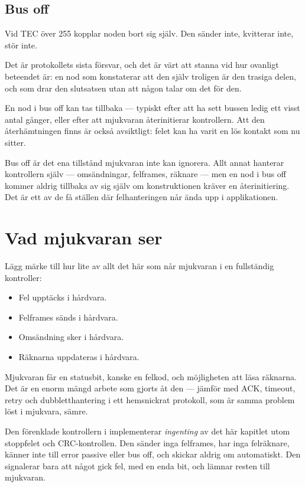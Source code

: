 \subsection{Bus off}

Vid TEC över 255 kopplar noden bort sig själv. Den sänder inte, kvitterar inte, stör inte.

Det är protokollets sista försvar, och det är värt att stanna vid hur ovanligt beteendet är: en
nod som konstaterar att den själv troligen är den trasiga delen, och som drar den slutsatsen
utan att någon talar om det för den.

En nod i bus off kan tas tillbaka --- typiskt efter att ha sett bussen ledig ett visst antal gånger,
eller efter att mjukvaran återinitierar kontrollern. Att den återhämtningen finns är också
avsiktligt: felet kan ha varit en lös kontakt som nu sitter.

\begin{aside}
 Bus off är det ena tillstånd mjukvaran inte kan ignorera.
Allt annat hanterar kontrollern själv --- omsändningar, felframes, räknare --- men en nod i bus off
kommer aldrig tillbaka av sig själv om konstruktionen kräver en återinitiering. Det är ett av de
få ställen där felhanteringen når ända upp i applikationen.
\end{aside}

\section{Vad mjukvaran ser}

Lägg märke till hur lite av allt det här som når mjukvaran i en fullständig kontroller:

\begin{itemize}
  \item Fel upptäcks i hårdvara.
  \item Felframes sänds i hårdvara.
  \item Omsändning sker i hårdvara.
  \item Räknarna uppdateras i hårdvara.
\end{itemize}

Mjukvaran får en statusbit, kanske en felkod, och möjligheten att läsa räknarna. Det är en
enorm mängd arbete som gjorts åt den --- jämför med ACK, timeout, retry och dubbletthantering i ett
hemsnickrat protokoll, som är samma problem löst i mjukvara, sämre.

\begin{simplification}
\note[Förenkling] Den förenklade kontrollern i  implementerar \emph{ingenting}
av det här kapitlet utom stopp\-felet och CRC-kontrollen. Den sänder inga felframes, har inga
felräknare, känner inte till error passive eller bus off, och skickar aldrig om automatiskt.
Den signalerar bara att något gick fel, med en enda bit, och lämnar resten till mjukvaran.
\end{simplification}

